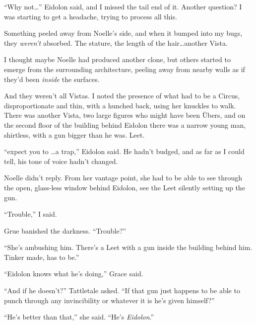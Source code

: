 ``Why not\ldots'' Eidolon said, and I missed the tail end of it.  Another question?  I was starting to get a headache, trying to process all this.



Something peeled away from Noelle's side, and when it bumped into my bugs, they \emph{weren't} absorbed.  The stature, the length of the hair\ldots another Vista.



I thought maybe Noelle had produced another clone, but others started to emerge from the surrounding architecture, peeling away from nearby walls as if they'd been \emph{inside} the surfaces.



And they weren't all Vistas.  I noted the presence of what had to be a Circus, disproportionate and thin, with a hunched back, using her knuckles to walk.  There was another Vista, two large figures who might have been \"{U}bers, and on the second floor of the building behind Eidolon there was a narrow young man, shirtless, with a gun bigger than he was.  Leet.



``\ldotsnot expect you to \ldots a trap,'' Eidolon said.  He hadn't budged, and as far as I could tell, his tone of voice hadn't changed.



Noelle didn't reply.  From her vantage point, she had to be able to see through the open, glass-less window behind Eidolon, see the Leet silently setting up the gun.



``Trouble,'' I said.



Grue banished the darkness.  ``Trouble?''



``She's ambushing him.  There's a Leet with a gun inside the building behind him.  Tinker made, has to be.''



``Eidolon knows what he's doing,'' Grace said.



``And if he doesn't?'' Tattletale asked.  ``If that gun just happens to be able to punch through any invincibility or whatever it is he's given himself?''



``He's better than that,'' she said.  ``He's \emph{Eidolon}.''



